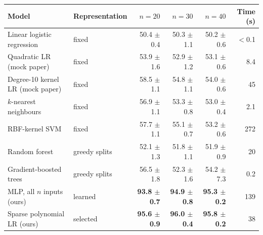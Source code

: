 \begin{tabular}{llrrrr}
\toprule
Model & Representation & $n=20$ & $n=30$ & $n=40$ & Time (s) \\
\midrule
Linear logistic regression & fixed & 50.4 $\pm$ 0.4 & 50.3 $\pm$ 1.1 & 50.2 $\pm$ 0.6 & $<$0.1 \\
Quadratic LR (mock paper) & fixed & 53.9 $\pm$ 1.6 & 52.9 $\pm$ 1.2 & 53.1 $\pm$ 0.6 & 8.4 \\
Degree-10 kernel LR (mock paper) & fixed & 58.5 $\pm$ 1.1 & 54.8 $\pm$ 1.1 & 54.0 $\pm$ 0.6 & 45 \\
$k$-nearest neighbours & fixed & 56.9 $\pm$ 1.1 & 53.3 $\pm$ 0.8 & 53.0 $\pm$ 0.4 & 2.1 \\
RBF-kernel SVM & fixed & 57.7 $\pm$ 1.1 & 55.1 $\pm$ 0.7 & 53.2 $\pm$ 0.6 & 272 \\
Random forest & greedy splits & 52.1 $\pm$ 1.3 & 51.8 $\pm$ 1.1 & 51.9 $\pm$ 0.9 & 20 \\
Gradient-boosted trees & greedy splits & 56.5 $\pm$ 1.8 & 52.3 $\pm$ 1.6 & 54.2 $\pm$ 7.3 & 0.2 \\
\midrule
MLP, all $n$ inputs (ours) & learned & \textbf{93.8 $\pm$ 0.7} & \textbf{94.9 $\pm$ 0.8} & \textbf{95.3 $\pm$ 0.2} & 139 \\
Sparse polynomial LR (ours) & selected & \textbf{95.6 $\pm$ 0.9} & \textbf{96.0 $\pm$ 0.4} & \textbf{95.8 $\pm$ 0.2} & 38 \\
\bottomrule
\end{tabular}
